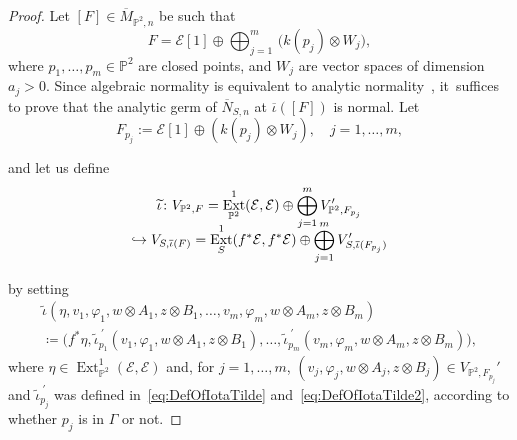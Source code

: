 \documentclass[JEP,XML,SOM,Unicode,published]{cedram}
\newcommand\hto{\mathrel{\lhook\joinrel\to}}
\newcommand{\PP}{{\mathbb P}}\let\P\PP
\newcommand\cE{\mathcal{E}}
\DeclareMathOperator{\Ext}{Ext}
\let\ov\overline
\let\phi\varphi
\theoremstyle{definition}
\begin{document}
\begin{proof}
Let $[F]\in\overline{M}_{\PP^2,n}$ be such that\vspace*{-5pt}
\[
F=\cE[1]\oplus \bigoplus_{j=1}^m\, \bigl(k(p_j)\otimes W_j \bigr),
\]
where $p_1,\dots,p_m\in \PP^2$ are closed points, and $W_j$ are vector spaces of dimension $a_j>0$.
Since algebraic normality is equivalent to analytic normality~\cite[Satz 4]{Kuh}, it~suffices to prove that the analytic germ of $\overline{N}_{S,n}$ at $\ov{\iota}([F])$ is normal.
Let\vspace*{-3pt}
\[
F_{p_j}:=\cE[1]\oplus \left(k(p_j)\otimes W_j\right),\quad j=1,\dots,m,
\]
\noindent
\begin{minipage}{\textwidth}
and let us define\vspace*{-5pt}
\begin{multline}\label{eq:01122025}
\widetilde{\iota}\colon V_{\PP^2,F}= \Ext^1_{\PP^2}(\cE,\cE)\oplus \bigoplus_{j=1}^m V_{\PP^2,F_{p_j}}'\\[-10pt]
\hto V_{S,\overline{\iota}(F)}=\Ext^1_{S}(f^*\cE,f^*\cE)\oplus \bigoplus_{j=1}^m V_{S,\overline{\iota}(F_{p_j})}'
\end{multline}
\end{minipage}
\par\noindent
by setting\vspace*{-5pt}
\begin{multline*}
\widetilde{\iota}\left(\eta,v_1,\phi_1,w\otimes A_1,z\otimes B_1,\dots,v_m,\phi_m,w\otimes A_m,z\otimes B_m\right)\\
\coloneqq \bigl(f^*\eta,\widetilde{\iota}_{p_1}^{\ \prime}(v_1,\phi_1,w\otimes A_1,z\otimes B_1),\dots,\widetilde{\iota}_{p_m}^{\ \prime}(v_m,\phi_m,w\otimes A_m,z\otimes B_m)\bigr),
\end{multline*}
where $\eta\in\Ext^1_{\PP^2}(\cE,\cE)$ and, for $j=1,\dots,m$, $(v_j,\phi_j,w\otimes A_j,z\otimes B_j)\in V_{\PP^2,F_{p_j}}'$ and $\widetilde{\iota}_{p_j}^{\ \prime}$ was defined in~\eqref{eq:DefOfIotaTilde} and~\eqref{eq:DefOfIotaTilde2}, according to whether $p_j$ is in $\mathsf{\Gamma}$ or not.


\end{proof}
\end{document}

